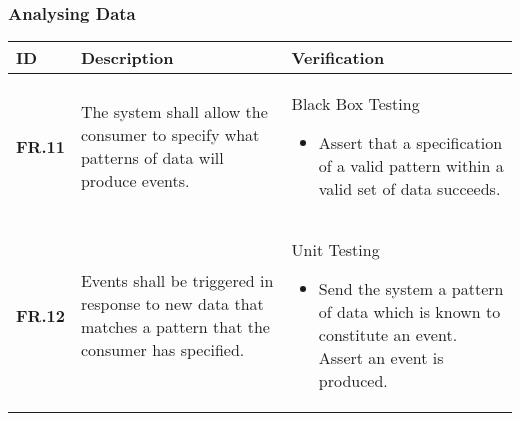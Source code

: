 \subsubsection{Analysing Data}
\begin{table}
    \begin{tabular}{|l|l|l|}
        \hline
        \textbf{ID}    & \textbf{Description}                                                                                      & \textbf{Verification}                                                                                                                                     \\ \hline
        \textbf{FR.11} & The system shall allow the consumer to specify what patterns of data will produce events.                 & Black Box Testing\begin{itemize}\item Assert that a specification of a valid pattern within a valid set of data succeeds.\end{itemize}              \\ \hline
        \textbf{FR.12} & Events shall be triggered in response to new data that matches a pattern that the consumer has specified. & Unit Testing\begin{itemize}\item Send the system a pattern of data which is known to constitute an event. Assert an event is produced.\end{itemize} \\ \hline
    \end{tabular}
\end{table}
